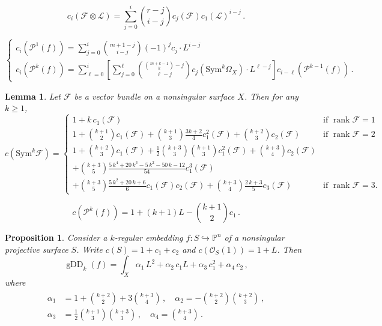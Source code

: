\documentclass[10pt,a4paper]{amsart}
\newtheorem{lemma}{Lemma}
\newtheorem{proposition}{Proposition}
\newcommand{\FF}{\mathcal{F}}
\newcommand{\LL}{\mathcal{L}}
\newcommand{\OO}{\mathcal{O}}
\renewcommand{\P}{\mathbb{P}}
\newcommand{\PP}{\mathcal{P}}
\newcommand{\gDD}{\operatorname{gDD}}
\newcommand{\rank}{\operatorname{rank}}
\begin{document}
\begin{equation}\label{lem: chern classes tensor product with line bundle}
c_i(\FF\otimes\LL) = \sum_{j=0}^i\binom{r-j}{i-j}c_j(\FF)c_1(\LL)^{i-j}\,.
\end{equation}

\begin{equation}\label{eq: recursive formula}
\begin{cases}
    c_i(\PP^1(f)) = \sum_{j=0}^i\binom{m+1-j}{i-j}(-1)^jc_j\cdot L^{i-j}\\
    c_i(\PP^k(f)) = \sum_{\ell=0}^i\left[\sum_{j=0}^\ell\binom{\binom{m+k-1}{k}-j}{\ell-j}c_j(\mathrm{Sym}^k\Omega_X)\cdot L^{\ell-j}\right]c_{i-\ell}(\PP^{k-1}(f))\,.
\end{cases}
\end{equation}

\begin{lemma}\label{lem: chern classes symmetric power vector bundle small rank}
Let $\FF$ be a vector bundle on a nonsingular surface $X$. Then for any $k\ge 1$,
\[
c(\mathrm{Sym}^k\FF) =
\begin{cases}
    1+k\,c_1(\FF) & \text{if $\rank\FF=1$}\\[3pt]
    1+\binom{k+1}{2}c_1(\FF)+\binom{k+1}{3}\frac{3k+2}{4}c_1^2(\FF)+\binom{k+2}{3}c_2(\FF) & \text{if $\rank\FF=2$}\\[3pt]
    1+\binom{k+2}{3}c_1(\FF)+\frac{1}{2}\binom{k+3}{3}\binom{k+1}{3}c_1^2(\FF)+\binom{k+3}{4}c_2(\FF) & \\[2pt]
    +\binom{k+3}{5}\frac{5\,k^4+20\,k^3-5\,k^2-50\,k-12}{54}c_1^3(\FF) & \\[2pt]
    +\binom{k+3}{5}\frac{5\,k^2+20\,k+6}{6}c_1(\FF)c_2(\FF)+\binom{k+3}{4}\frac{2\,k+3}{5}c_3(\FF) & \text{if $\rank\FF=3$.}
\end{cases}
\]
\end{lemma}

\begin{equation}\label{eq: identity total chern class J_k curve}
c(\PP^k(f)) = 1+(k+1)L-\binom{k+1}{2}c_1\,.
\end{equation}

\begin{proposition}\label{prop: gEDD k-regular surface}
Consider a $k$-regular embedding $f\colon S\hookrightarrow\P^n$ of a nonsingular projective surface $S$. Write $c(S)=1+c_1+c_2$ and $c(\OO_S(1))=1+L$. Then
\begin{equation}\label{eq: gEDD k-regular surface}
\gDD_k(f) = \int_X\alpha_1\,L^2+\alpha_2\,c_1L+\alpha_3\,c_1^2+\alpha_4\,c_2\,,
\end{equation}
where
\begin{align}\label{eq: coefficients alpha}
\begin{split}
    \alpha_1 &= 1+\binom{k+2}{2}+3\binom{k+3}{4}\,,\quad\alpha_2 = -\binom{k+2}{2}\binom{k+2}{3}\,,\\
    \alpha_3 &= \frac{1}{2}\binom{k+1}{3}\binom{k+3}{3}\,,\quad\alpha_4 = \binom{k+3}{4}\,.
\end{split}
\end{align}
\end{proposition}
\end{document}
